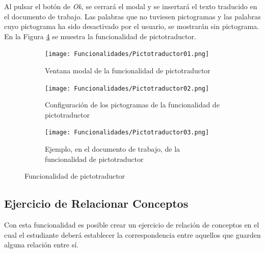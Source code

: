 Al pulsar el botón de \textit{Ok}, se cerrará el modal y se insertará el texto traducido en el documento de trabajo. Las palabras que no tuviesen pictogramas y las palabras cuyo pictograma ha sido desactivado por el usuario, se mostrarán sin pictograma. En la Figura \ref{fig:imppictotraductor} se muestra la funcionalidad de pictotraductor.

\begin{figure}[ht!]
  \centering
  \begin{subfigure}{\textwidth}
    \centering
    \texttt{[image: Funcionalidades/Pictotraductor01.png]}
    \caption{Ventana modal de la funcionalidad de pictotraductor}
    \label{fig:imppictotraductor01}
  \end{subfigure}

  \begin{subfigure}{\textwidth}
    \centering
    \texttt{[image: Funcionalidades/Pictotraductor02.png]}
    \caption{Configuración de los pictogramas de la funcionalidad de pictotraductor}
    \label{fig:imppictotraductor02}
  \end{subfigure}

  \begin{subfigure}{\textwidth}
    \centering
    \texttt{[image: Funcionalidades/Pictotraductor03.png]}
    \caption{Ejemplo, en el documento de trabajo, de la funcionalidad de pictotraductor}
    \label{fig:imppictotraductor03}
  \end{subfigure}

  \caption{Funcionalidad de pictotraductor}
  \label{fig:imppictotraductor}
\end{figure}

\subsection{Ejercicio de Relacionar Conceptos}
\label{sec:ejercicioRelacionarConceptos}
Con esta funcionalidad es posible crear un ejercicio de relación de conceptos en el cual el estudiante deberá establecer la correspondencia entre aquellos que guarden alguna relación entre sí.

